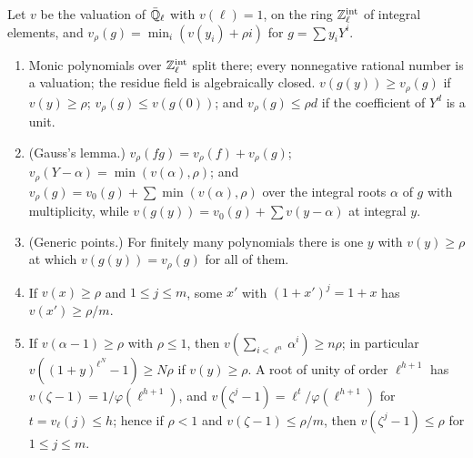 \begin{lemma}\label{lem:gauss}
Let $v$ be the valuation of $\bar{\mathbb{Q}}_\ell$ with $v(\ell)=1$, on the ring $\mathbb{Z}_\ell^{\rm int}$ of integral elements, and $v_\rho(g)=\min_i(v(y_i)+\rho i)$ for $g=\sum y_iY^i$.
\begin{enumerate}[label=\textup{(\alph*)}]
\item Monic polynomials over $\mathbb{Z}_\ell^{\rm int}$ split there; every nonnegative rational number is a valuation; the residue field is algebraically closed. $v(g(y))\ge v_\rho(g)$ if $v(y)\ge\rho$; $v_\rho(g)\le v(g(0))$; and $v_\rho(g)\le\rho d$ if the coefficient of $Y^d$ is a unit.
\item (Gauss's lemma.) $v_\rho(fg)=v_\rho(f)+v_\rho(g)$; $v_\rho(Y-\alpha)=\min(v(\alpha),\rho)$; and $v_\rho(g)=v_0(g)+\sum\min(v(\alpha),\rho)$ over the integral roots $\alpha$ of $g$ with multiplicity, while $v(g(y))=v_0(g)+\sum v(y-\alpha)$ at integral $y$.
\item (Generic points.) For finitely many polynomials there is one $y$ with $v(y)\ge\rho$ at which $v(g(y))=v_\rho(g)$ for all of them.
\item If $v(x)\ge\rho$ and $1\le j\le m$, some $x'$ with $(1+x')^j=1+x$ has $v(x')\ge\rho/m$.
\item If $v(\alpha-1)\ge\rho$ with $\rho\le1$, then $v(\sum_{i<\ell^n}\alpha^i)\ge n\rho$; in particular $v((1+y)^{\ell^N}-1)\ge N\rho$ if $v(y)\ge\rho$. A root of unity of order $\ell^{h+1}$ has $v(\zeta-1)=1/\varphi(\ell^{h+1})$, and $v(\zeta^j-1)=\ell^t/\varphi(\ell^{h+1})$ for $t=v_\ell(j)\le h$; hence if $\rho<1$ and
$v(\zeta-1)\le\rho/m$, then $v(\zeta^j-1)\le\rho$ for $1\le j\le m$.
\end{enumerate}
\end{lemma}

